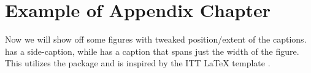 \chapter{Example of Appendix Chapter} \label{appendix:example}

\begin{example}
    Now we will show off some figures with tweaked position/extent of the captions.
     has a side-caption, while  has a caption that spans just the width of the figure.
    This utilizes the  package and is inspired by the ITT \LaTeX{} template \autocite{ITTtemplate}.
\end{example}

%
%

